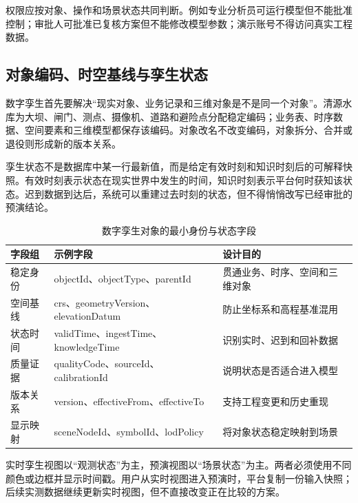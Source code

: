 权限应按对象、操作和场景状态共同判断。例如专业分析员可运行模型但不能批准控制；审批人可批准已复核方案但不能修改模型参数；演示账号不得访问真实工程数据。

\subsection{对象编码、时空基线与孪生状态}

数字孪生首先要解决“现实对象、业务记录和三维对象是不是同一个对象”。清源水库为大坝、闸门、测点、摄像机、道路和避险点分配稳定编码；业务表、时序数据、空间要素和三维模型都保存该编码。对象改名不改变编码，对象拆分、合并或退役则形成新的版本关系。

孪生状态不是数据库中某一行最新值，而是给定有效时刻和知识时刻后的可解释快照。有效时刻表示状态在现实世界中发生的时间，知识时刻表示平台何时获知该状态。迟到数据到达后，系统可以重建过去时刻的状态，但不得悄悄改写已经审批的预演结论。

\begin{table}[htbp]
\centering
\caption{数字孪生对象的最小身份与状态字段}
\label{tab:twin-object-state}
\begin{tabular}{p{2.4cm}p{4.6cm}p{5.6cm}}
\toprule
字段组 & 示例字段 & 设计目的 \\
\midrule
稳定身份 & objectId、objectType、parentId & 贯通业务、时序、空间和三维对象 \\
空间基线 & crs、geometryVersion、elevationDatum & 防止坐标系和高程基准混用 \\
状态时间 & validTime、ingestTime、knowledgeTime & 识别实时、迟到和回补数据 \\
质量证据 & qualityCode、sourceId、calibrationId & 说明状态是否适合进入模型 \\
版本关系 & version、effectiveFrom、effectiveTo & 支持工程变更和历史重现 \\
显示映射 & sceneNodeId、symbolId、lodPolicy & 将对象状态稳定映射到场景 \\
\bottomrule
\end{tabular}
\end{table}

实时孪生视图以“观测状态”为主，预演视图以“场景状态”为主。两者必须使用不同颜色或边框并显示时间戳。用户从实时视图进入预演时，平台复制一份输入快照；后续实测数据继续更新实时视图，但不直接改变正在比较的方案。

